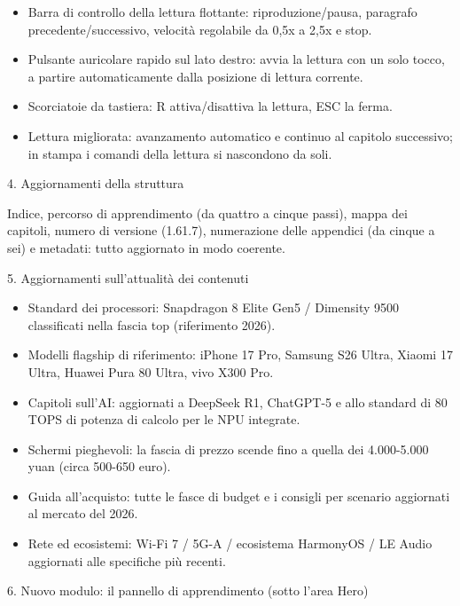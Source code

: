 \begin{itemize}
  \item Barra di controllo della lettura flottante: riproduzione/pausa, paragrafo precedente/successivo, velocità regolabile da 0,5x a 2,5x e stop.
  \item Pulsante auricolare rapido sul lato destro: avvia la lettura con un solo tocco, a partire automaticamente dalla posizione di lettura corrente.
  \item Scorciatoie da tastiera: R attiva/disattiva la lettura, ESC la ferma.
  \item Lettura migliorata: avanzamento automatico e continuo al capitolo successivo; in stampa i comandi della lettura si nascondono da soli.
\end{itemize}

4. Aggiornamenti della struttura

Indice, percorso di apprendimento (da quattro a cinque passi), mappa dei capitoli, numero di versione (1.61.7), numerazione delle appendici (da cinque a sei) e metadati: tutto aggiornato in modo coerente.

5. Aggiornamenti sull'attualità dei contenuti

\begin{itemize}
  \item Standard dei processori: Snapdragon 8 Elite Gen5 / Dimensity 9500 classificati nella fascia top (riferimento 2026).
  \item Modelli flagship di riferimento: iPhone 17 Pro, Samsung S26 Ultra, Xiaomi 17 Ultra, Huawei Pura 80 Ultra, vivo X300 Pro.
  \item Capitoli sull'AI: aggiornati a DeepSeek R1, ChatGPT-5 e allo standard di 80 TOPS di potenza di calcolo per le NPU integrate.
  \item Schermi pieghevoli: la fascia di prezzo scende fino a quella dei 4.000-5.000 yuan (circa 500-650 euro).
  \item Guida all'acquisto: tutte le fasce di budget e i consigli per scenario aggiornati al mercato del 2026.
  \item Rete ed ecosistemi: Wi-Fi 7 / 5G-A / ecosistema HarmonyOS / LE Audio aggiornati alle specifiche più recenti.
\end{itemize}

6. Nuovo modulo: il pannello di apprendimento (sotto l'area Hero)

